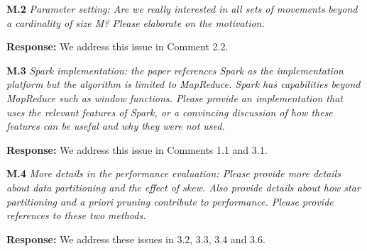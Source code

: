 \documentclass{vldb}
\newcommand{\eat}[1]{}
\begin{document}
\eat{

In addition to our response to comments 2.1, another novelty of our work lies in the 
techniques. 
Although the idea of star partition and apriori enumeration are well-known, 
linking them together to solve the problem in trajectory domain has not been attempted before.
Besides, we input heavy details on these algorithms (e.g., theoretical bounds of partition and
anti-monotonicity) which have not been previously proposed yet.
}


\textbf{M.2} \emph{Parameter setting: Are we really interested in all sets of movements beyond a cardinality of size M? Please elaborate
on the motivation.}

\textbf{Response:} We address this issue in Comment 2.2. 

\textbf{M.3} \emph{Spark implementation: the paper references Spark as the implementation platform but the algorithm is limited to MapReduce. Spark has capabilities beyond MapReduce such as window functions. Please provide an implementation that uses the relevant features of Spark, or a convincing discussion of how these features can be useful and why they were not used.}

\textbf{Response:} We address this issue in Comments 1.1 and 3.1.

\textbf{M.4} \emph{More details in the performance evaluation: Please provide more details about data partitioning and the effect of skew. Also provide details about how star partitioning and a priori pruning contribute to performance. Please provide references to these two methods.}

\textbf{Response:} We address these issues in 3.2, 3.3, 3.4 and 3.6.
\end{document}
